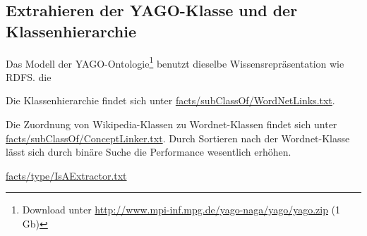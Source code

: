 \subsection{Extrahieren der YAGO-Klasse und der Klassenhierarchie}
Das Modell der YAGO-Ontologie\footnote{Download unter \url{http://www.mpi-inf.mpg.de/yago-naga/yago/yago.zip} (1 Gb)} benutzt dieselbe Wissensrepräsentation wie RDFS.
die 

Die Klassenhierarchie findet sich unter \url{facts/subClassOf/WordNetLinks.txt}.

Die Zuordnung von Wikipedia-Klassen zu Wordnet-Klassen findet sich unter \url{facts/subClassOf/ConceptLinker.txt}.
Durch Sortieren nach der Wordnet-Klasse lässt sich durch binäre Suche die Performance wesentlich erhöhen.

\url{facts/type/IsAExtractor.txt}